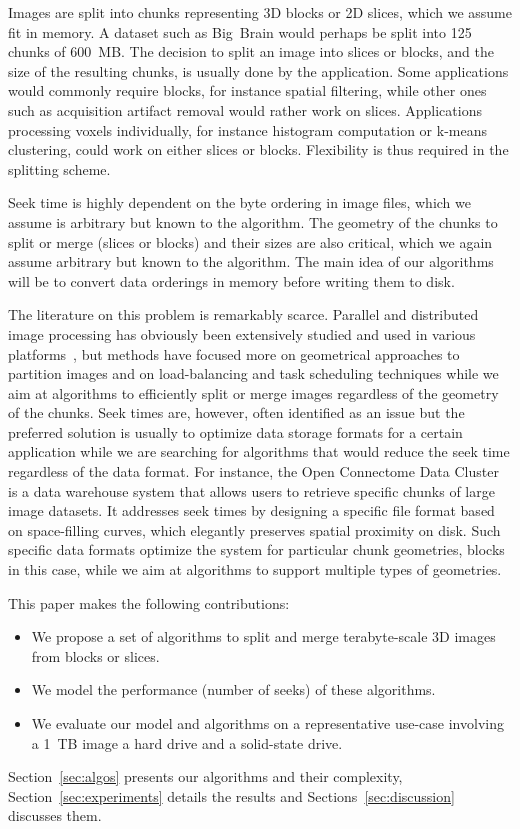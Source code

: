 \documentclass[10pt, conference, compsocconf]{IEEEtran}
\newcommand{\todo}[1]{\marginpar{\parbox{18mm}{\flushleft\tiny\color{red}\textbf{TODO}:
      #1}}}
\begin{document}
Images are split into chunks representing 3D blocks or 2D slices,
which we assume fit in memory. A dataset such as Big~Brain would
perhaps be split into 125 chunks of 600~MB. The decision to split an
image into slices or blocks, and the size of the resulting chunks, is
usually done by the application. Some applications would commonly
require blocks, for instance spatial filtering, while other ones such
as acquisition artifact removal would rather work on
slices. Applications processing voxels individually, for instance
histogram computation or k-means clustering, could work on either
slices or blocks. Flexibility is thus required in the splitting
scheme.

Seek time is highly dependent on the byte ordering in image files,
which we assume is arbitrary but known to the algorithm. The geometry
of the chunks to split or merge (slices or blocks) and their sizes are
also critical, which we again assume arbitrary but known to the
algorithm.  The main idea of our algorithms will be to convert data
orderings in memory before writing them to disk.

The literature on this problem is remarkably scarce. Parallel and
distributed image processing has obviously been extensively studied
and used in various
platforms~\cite{miguet1991elastic,tang2007eman2,yang2008parallel,braunl2013parallel,moise2013terabyte,bajcsy2013terabyte},
but methods have focused more on geometrical approaches to partition
images and on load-balancing and task scheduling techniques while we
aim at algorithms to efficiently split or merge images regardless of
the geometry of the chunks. Seek times are, however, often identified
as an issue but the preferred solution is usually to optimize data
storage formats for a certain application while we are searching for
algorithms that would reduce the seek time regardless of the data
format. For instance, the Open Connectome Data
Cluster~\cite{burns2013open} is a data warehouse system that allows
users to retrieve specific chunks of large image datasets. It
addresses seek times by designing a specific file format based on
space-filling curves, which elegantly preserves spatial proximity on
disk. Such specific data formats optimize the system for particular
chunk geometries, blocks in this case, while we aim at algorithms to
support multiple types of geometries.

This paper makes the following contributions:
\begin{itemize}
  \item We propose a set of algorithms to split and merge
    terabyte-scale 3D images from blocks or slices.
  \item We model the performance (number of seeks) of these algorithms.
  \item We evaluate our model and algorithms on a representative
    use-case involving a 1~TB image a hard drive and a solid-state
    drive.
\end{itemize}
Section~\ref{sec:algos} presents our algorithms and their complexity,
Section~\ref{sec:experiments} details the results and
Sections~\ref{sec:discussion} discusses them.\todo{Revise when outline is final.}
\end{document}
